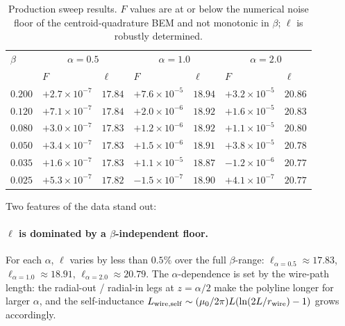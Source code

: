 \documentclass[11pt]{article}
\begin{document}
\begin{table}[h]
\centering
\begin{tabular}{l|ll|ll|ll}\toprule
$\beta$ & \multicolumn{2}{c|}{$\alpha=0.5$} &
         \multicolumn{2}{c|}{$\alpha=1.0$} &
         \multicolumn{2}{c}{$\alpha=2.0$} \\
        & $F$ & $\ell$ & $F$ & $\ell$ & $F$ & $\ell$ \\\midrule
$0.200$ & $+2.7\!\times\!10^{-7}$ & $17.84$ & $+7.6\!\times\!10^{-5}$ & $18.94$ & $+3.2\!\times\!10^{-5}$ & $20.86$ \\
$0.120$ & $+7.1\!\times\!10^{-7}$ & $17.84$ & $+2.0\!\times\!10^{-6}$ & $18.92$ & $+1.6\!\times\!10^{-5}$ & $20.83$ \\
$0.080$ & $+3.0\!\times\!10^{-7}$ & $17.83$ & $+1.2\!\times\!10^{-6}$ & $18.92$ & $+1.1\!\times\!10^{-5}$ & $20.80$ \\
$0.050$ & $+3.4\!\times\!10^{-7}$ & $17.83$ & $+1.5\!\times\!10^{-6}$ & $18.91$ & $+3.8\!\times\!10^{-5}$ & $20.78$ \\
$0.035$ & $+1.6\!\times\!10^{-7}$ & $17.83$ & $+1.1\!\times\!10^{-5}$ & $18.87$ & $-1.2\!\times\!10^{-6}$ & $20.77$ \\
$0.025$ & $+5.3\!\times\!10^{-7}$ & $17.82$ & $-1.5\!\times\!10^{-7}$ & $18.90$ & $+4.1\!\times\!10^{-7}$ & $20.77$ \\\bottomrule
\end{tabular}
\caption{Production sweep results.  $F$ values are at or below the
numerical noise floor of the centroid-quadrature BEM and not monotonic
in $\beta$; $\ell$ is robustly determined.}
\label{tab:sweep}
\end{table}

Two features of the data stand out:

\paragraph{$\ell$ is dominated by a $\beta$-independent floor.}  For
each $\alpha$, $\ell$ varies by less than $0.5\%$ over the full
$\beta$-range:
$\ell_{\alpha=0.5}\approx 17.83$,
$\ell_{\alpha=1.0}\approx 18.91$,
$\ell_{\alpha=2.0}\approx 20.79$.  The $\alpha$-dependence is set by
the wire-path length: the radial-out / radial-in legs at $z=\alpha/2$
make the polyline longer for larger $\alpha$, and the self-inductance
$L_{\rm wire,self}\sim (\mu_0/2\pi) L (\ln(2L/r_{\rm wire})-1)$ grows
accordingly.
\end{document}
